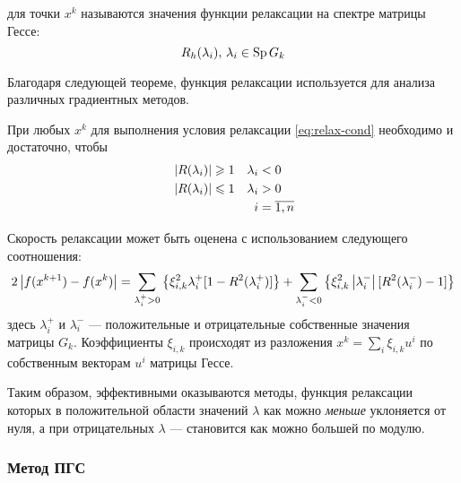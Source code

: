 \begin{dfn}
   для точки $x^k$ называются значения
  функции релаксации на спектре матрицы Гессе:
  \begin{equation}
    \label{eq:relax-fac}
    R_h(\lambda_i),\, \lambda_i \in \operatorname{Sp}{G_k}
  \end{equation}
\end{dfn}

Благодаря следующей теореме, функция релаксации используется для
анализа различных градиентных методов.

\begin{thm}
  \label{thm:relax-thm}
  При любых $x^k$ для выполнения условия релаксации
  \eqref{eq:relax-cond} необходимо и достаточно, чтобы
  \begin{equation}
    \label{eq:relax-thm}
    \begin{aligned}
      & \left \lvert{R(\lambda_i)}\right \rvert \geqslant 1 & \lambda_i& < 0 \\
      & \left \lvert{R(\lambda_i)}\right \rvert \leqslant 1 & \lambda_i& > 0\\
      &&i& = \overline{1, n}
    \end{aligned}
  \end{equation}
\end{thm}



Скорость релаксации может быть оценена с использованием следующего
соотношения:
\begin{equation}
  \label{eq:relax-speed}
  2\left \lvert{f(x^{k+1})-f(x^k)}\right \rvert=\sum_{\lambda_i^+>0} \left\{\xi_{i,k}^2
    \lambda_i^+ [1-R^2(\lambda_i^+)]\right\} + \sum_{\lambda_i^-<0} \left\{\xi_{i,k}^2
    \left \lvert{\lambda_i^-}\right \rvert [R^2(\lambda_i^-)-1]\right\}
\end{equation}
здесь $\lambda_i^+$ и $\lambda_i^-$ — положительные и отрицательные
собственные значения матрицы $G_k$. Коэффициенты $\xi_{i,k}$
происходят из разложения $x^k=\sum_i{\xi_{i,k}u^i}$ по собственным
векторам $u^i$ матрицы Гессе.

Таким образом, эффективными оказываются методы, функция релаксации
которых в положительной области значений $\lambda$ как можно
\emph{меньше} уклоняется от нуля, а при отрицательных $\lambda$ —
становится как можно большей по модулю.

\subsubsection{Метод ПГС}
\label{sec:gd}

